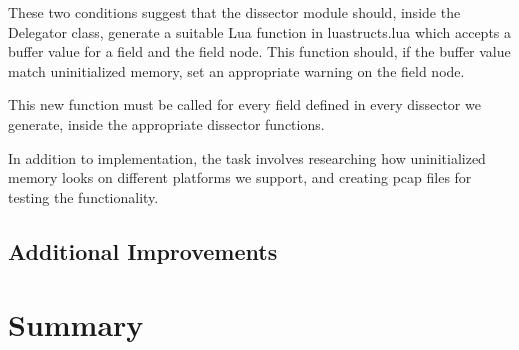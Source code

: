 These two conditions suggest that the dissector module should, inside the Delegator class, generate a suitable Lua function in luastructs.lua which accepts a buffer value for a field and the field node. This function should, if the buffer value match uninitialized memory,  set an appropriate warning on the field node.

This new function must be called for every field defined in every dissector we generate, inside the appropriate dissector functions.

In addition to implementation, the task involves researching how uninitialized memory looks on different platforms we support, and creating pcap files for testing the functionality.

\subsection{Additional Improvements}

\section{Summary}
